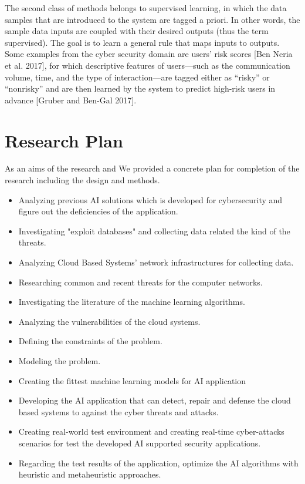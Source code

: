 The second class of methods belongs to supervised learning, in which the data samples
that are introduced to the system are tagged a priori. In other words, the sample data
inputs are coupled with their desired outputs (thus the term supervised). The goal is to
learn a general rule that maps inputs to outputs. Some examples from the cyber security
domain are users’ risk scores [Ben Neria et al. 2017], for which descriptive features
of users—such as the communication volume, time, and the type of interaction—are
tagged either as “risky” or “nonrisky” and are then learned by the system to predict
high-risk users in advance [Gruber and Ben-Gal 2017].

\section{Research Plan}

 As an aims of the research and We provided a concrete plan for completion of the research including the design and methods. 

\begin{itemize}
    \item {
        Analyzing previous AI solutions which is developed for cybersecurity and figure out the deficiencies of the application. 
     }
    
     \item{
        Investigating "exploit databases" and collecting data related the kind of the threats.  
     }
     \item {
        Analyzing Cloud Based Systems' network infrastructures for collecting data. 
     }
    
     \item {
        Researching common and recent threats for the computer networks.
     }

     \item {
        Investigating the literature of the machine learning algorithms. 
    }
    \item {
        Analyzing the vulnerabilities of the cloud systems.   
    }

     \item {
        Defining the constraints of the problem.
     }

     \item {
        Modeling the problem. 
     }
     \item {
        Creating the fittest machine learning models for AI application 
     }
     \item {
        Developing the AI application that can detect, repair and defense the cloud based systems to against the cyber threats and attacks.
     }
    \item {
        Creating real-world test environment and creating real-time cyber-attacks scenarios for test the developed AI supported security applications.
    }

    \item {
        Regarding the test results of the application, optimize the AI algorithms with heuristic and metaheuristic approaches.  
    }

\end{itemize} 